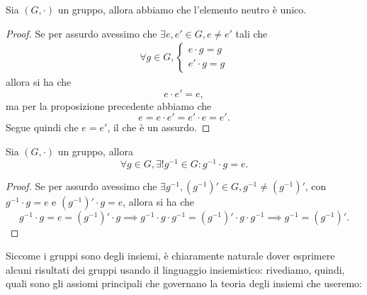 \begin{prop}
	Sia $(G, \cdot)$ un gruppo, allora abbiamo che l'elemento neutro è unico.
\end{prop}

\begin{proof}
	Se per assurdo avessimo che $\exists e, e' \in G, e \neq e'$ tali che
	\begin{align}
		\forall g \in G, \begin{cases*}
			e \cdot g = g \\
			e' \cdot g = g
		\end{cases*}
	\end{align}
	allora si ha che
	\begin{equation}
		e \cdot e' = e,
	\end{equation}
	ma per la proposizione precedente abbiamo che
	\begin{equation}
		e = e \cdot e' = e' \cdot e = e'.
	\end{equation}
	Segue quindi che $e = e'$, il che è un assurdo.
\end{proof}

\begin{prop}
	Sia $(G, \cdot)$ un gruppo, allora
	\begin{equation}
		\forall g \in G, \exists! g^{-1} \in G : g^{-1} \cdot g = e.
	\end{equation}
\end{prop}
\begin{proof}
	Se per assurdo avessimo che $\exists g^{-1}, (g^{-1})' \in G, g^{-1} \neq (g^{-1})'$, con $g^{-1} \cdot g = e$ e $(g^{-1})' \cdot g = e$, allora si ha che
	\begin{equation}
		g^{-1} \cdot g = e = (g^{-1})' \cdot g \implies g^{-1} \cdot g \cdot g^{-1} = (g^{-1})' \cdot g \cdot g^{-1} \implies g^{-1} = (g^{-1})'.
	\end{equation}
\end{proof}

Siccome i gruppi sono degli insiemi, è chiaramente naturale dover esprimere alcuni risultati dei gruppi usando il linguaggio insiemistico: rivediamo, quindi, quali sono gli assiomi
principali che governano la teoria degli insiemi che useremo:

